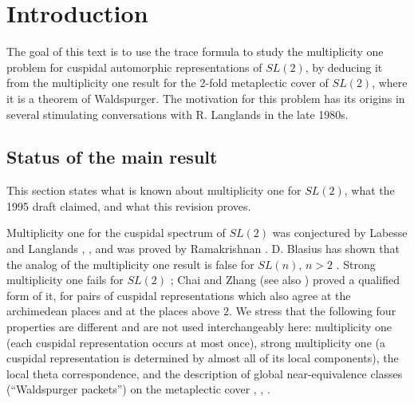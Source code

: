 \documentclass[12pt,letterpaper]{book}
\theoremstyle{plain}
\theoremstyle{definition}
\theoremstyle{remark}
\theoremstyle{remark}
\begin{document}
\chapter{Introduction}\label{ch:intro}

The goal of this text is to use the trace formula to study the
multiplicity one problem for cuspidal automorphic representations of
$SL(2)$, by deducing it from the multiplicity one result for
the 2-fold metaplectic cover of $SL(2)$, where it is a theorem
of Waldspurger. The motivation for this problem
has its origins in several stimulating conversations
with R. Langlands in the late 1980s.

\section{Status of the main result}

This section states what is known about multiplicity one for $SL(2)$, what the 1995 draft claimed, and what this revision proves.


Multiplicity one for the cuspidal spectrum of $SL(2)$ was conjectured
by Labesse and Langlands \cite{LL}, \cite{Lab}, and was proved by
Ramakrishnan \cite{Ra}. D. Blasius has shown that the analog of the
multiplicity one result is false for $SL(n)$, $n>2$ \cite{Blas}.
Strong multiplicity one fails for $SL(2)$ \cite{LL}; Chai and Zhang
\cite{CZ} (see also \cite{Zh}) proved a qualified form of it, for pairs
of cuspidal representations which also agree at the archimedean places
and at the places above $2$. We stress that the following four
properties are different and are not used interchangeably here:
multiplicity one (each cuspidal representation occurs at most once),
strong multiplicity one (a cuspidal representation is determined by
almost all of its local components), the local theta correspondence,
and the description of global near-equivalence classes (``Waldspurger
packets'') on the metaplectic cover \cite{Wa1}, \cite{Wa2}, \cite{PS}.
\end{document}

